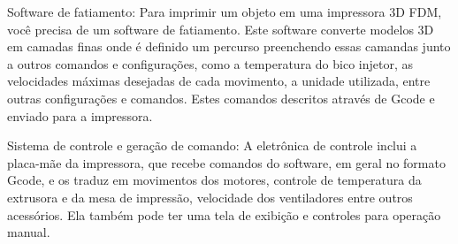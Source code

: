 Software de fatiamento: Para imprimir um objeto em uma impressora 3D FDM, você precisa de um software de fatiamento. 
Este software converte modelos 3D em camadas finas onde é definido um percurso preenchendo essas camandas junto
a outros comandos e configurações, como a temperatura do bico injetor, as velocidades máximas desejadas de cada movimento,
a unidade utilizada, entre outras configurações e comandos. Estes comandos descritos através de Gcode e enviado para a impressora. 

Sistema de controle e geração de comando: A eletrônica de controle inclui a placa-mãe da impressora, que recebe comandos do 
software, em geral no formato Gcode, e os traduz em movimentos dos motores, controle de temperatura da extrusora e da mesa de impressão, 
velocidade dos ventiladores entre outros acessórios. 
Ela também pode ter uma tela de exibição e controles para operação manual.